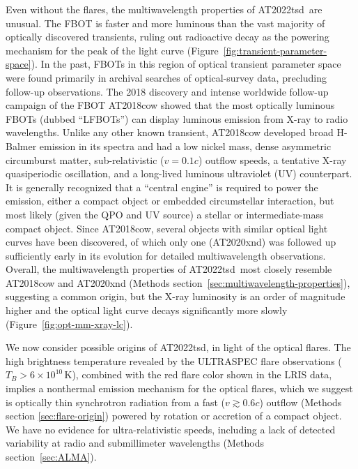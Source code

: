 \documentclass{nature_plusfigure}
\newcommand{\at}{AT2022tsd}
\begin{document}
Even without the flares, the multiwavelength properties of \at\ are unusual. The FBOT is faster and more luminous than the vast majority of optically discovered transients, ruling out radioactive decay as the powering mechanism for the peak of the light curve (Figure~\ref{fig:transient-parameter-space}). In the past, FBOTs in this region of optical transient parameter space were found primarily in archival searches of optical-survey data\cite{Drout2014,Arcavi2016,Pursiainen2018,Ho2022_RET}, precluding follow-up observations. The 2018 discovery\cite{Prentice2018} and intense worldwide follow-up campaign of the FBOT AT2018cow showed that the most optically luminous FBOTs (dubbed ``LFBOTs'')\cite{Metzger2022} can display luminous emission from X-ray to radio wavelengths\cite{RiveraSandoval2018,Margutti2019,Ho2019}. Unlike any other known transient, AT2018cow developed broad H-Balmer emission in its spectra\cite{Perley2019} and had a low nickel mass\cite{Perley2019}, dense\cite{Ho2019} asymmetric\cite{Margutti2019,Maund2023} circumburst matter, sub-relativistic ($v=0.1c$)\cite{Ho2019} outflow speeds, a tentative X-ray quasiperiodic oscillation\cite{Pasham2021,Zhang2022}, and a long-lived luminous ultraviolet (UV) counterpart\cite{Sun2023}. It is generally recognized that a ``central engine'' is required to power the emission, either a compact object\cite{Prentice2018,Perley2019,Margutti2019,Ho2019} or embedded circumstellar interaction\cite{Margutti2019}, but most likely (given the QPO and UV source) a stellar\cite{Margutti2019,Pasham2021} or intermediate-mass\cite{Kuin2019,Perley2019,Zhang2022,Chen2023} compact object. 
Since AT2018cow, several objects with similar optical light curves have been discovered\cite{Coppejans2020,Ho2020_Koala,Perley2021,Yao2022}, of which only one (AT2020xnd\cite{Perley2021}) was followed up sufficiently early in its evolution for detailed multiwavelength observations\cite{Bright2022,Ho2022_AT2020xnd}. Overall, the multiwavelength properties of \at\ most closely resemble AT2018cow and AT2020xnd (Methods section~\ref{sec:multiwavelength-properties}), suggesting a common origin, but the X-ray luminosity is an order of magnitude higher and the optical light curve decays significantly more slowly (Figure~\ref{fig:opt-mm-xray-lc}).

We now consider possible origins of \at, in light of the optical flares. The high brightness temperature revealed by the ULTRASPEC flare observations ($T_B>6\times10^{10}\,$K), combined with the red flare color shown in the LRIS data, implies a nonthermal emission mechanism for the optical flares, which we suggest is optically thin synchrotron radiation from a fast ($v\gtrsim0.6c$) outflow (Methods section \ref{sec:flare-origin}) powered by rotation or accretion of a compact object.
We have no evidence for ultra-relativistic speeds, including a lack of detected variability at radio and submillimeter wavelengths (Methods section~\ref{sec:ALMA}).
\end{document}
